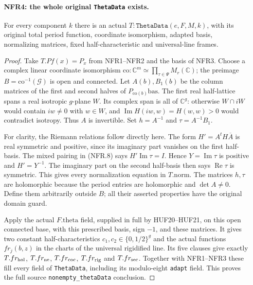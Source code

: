 \paragraph{NFR4: the whole original \texttt{ThetaData} exists.}
\label{claim:NFR4}
For every component $k$ there is an actual
$T:\texttt{ThetaData}(e,F,M,k)$, with its original total period
function, coordinate isomorphism, adapted basis, normalizing
matrices, fixed half-characteristic and universal-line frames.

\begin{proof}
Take $T.Pf(x)=P_x$ from NFR1--NFR2 and the basis of NFR3.
Choose a complex linear coordinate isomorphism
$\mathrm{co}:\mathbb C^m\simeq\prod_{\tau\in\Psi}M_r(\mathbb C)$;
the preimage $B=\mathrm{co}^{-1}(\mathcal G)$ is open and connected.
Let $A(b),B_1(b)$ be the column matrices of the first and second
halves of $P_{\mathrm{co}(b)}\mathrm{bas}$.
The first real half-lattice spans a real isotropic $g$-plane $W$.
Its complex span is all of $\mathbb C^g$: otherwise $W\cap iW$
would contain $iw\ne0$ with $w\in W$, and
$\operatorname{Im}H(iw,w)=H(w,w)>0$ would contradict isotropy.
Thus $A$ is invertible.  Set $h=A^{-1}$ and $\tau=A^{-1}B_1$.

For clarity, the Riemann relations follow directly here.
The form $H'=A^tH\overline A$ is real symmetric and positive,
since its imaginary part vanishes on the first half-basis.
The mixed pairing in (NFR.8) says
$H'\operatorname{Im}\tau=I$.  Hence $Y=\operatorname{Im}\tau$
is positive and $H'=Y^{-1}$.  The imaginary part on the second
half-basis then says $\operatorname{Re}\tau$ is symmetric.
This gives every normalization equation in $T.\mathrm{norm}$.
The matrices $h,\tau$ are holomorphic because the period entries
are holomorphic and $\det A\ne0$.  Define them arbitrarily outside
$B$; all their asserted properties have the original domain guard.

Apply the actual $F.\mathrm{theta}$ field, supplied in full by
HUF20--HUF21, on this open connected base, with this prescribed
basis, sign $-1$, and these matrices.  It gives two constant
half-characteristics $c_1,c_2\in\{0,1/2\}^g$ and the actual
functions $fr_j(b,z)$ in the charts of the universal rigidified
line.  Its five clauses give exactly $T.fr_{\rm hol}$,
$T.fr_{\rm ne}$, $T.fr_{\rm coc}$, $T.fr_{\rm rig}$ and
$T.fr_{\rm sec}$.  Together with NFR1--NFR3 these fill every
field of \texttt{ThetaData}, including its modulo-eight
\texttt{adapt} field.  This proves the full source
\texttt{nonempty\_thetaData} conclusion.
\end{proof}


